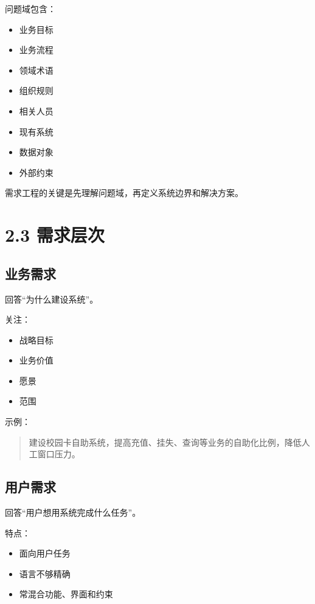 \documentclass[UTF8,zihao=-4]{ctexart}
\begin{document}
问题域包含：

\begin{itemize}
\item 业务目标
\item 业务流程
\item 领域术语
\item 组织规则
\item 相关人员
\item 现有系统
\item 数据对象
\item 外部约束
\end{itemize}

需求工程的关键是先理解问题域，再定义系统边界和解决方案。

\section{2.3 需求层次}

\subsection{业务需求}

回答“为什么建设系统”。

关注：

\begin{itemize}
\item 战略目标
\item 业务价值
\item 愿景
\item 范围
\end{itemize}

示例：

\begin{quote}
建设校园卡自助系统，提高充值、挂失、查询等业务的自助化比例，降低人工窗口压力。
\end{quote}

\subsection{用户需求}

回答“用户想用系统完成什么任务”。

特点：

\begin{itemize}
\item 面向用户任务
\item 语言不够精确
\item 常混合功能、界面和约束
\end{itemize}
\end{document}
